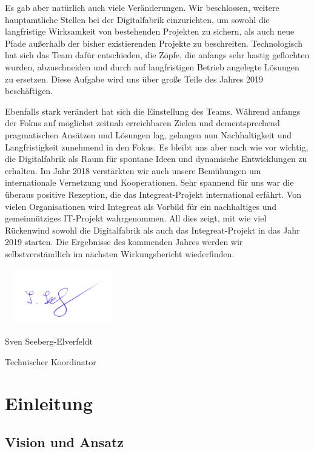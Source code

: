 \documentclass[12pt, a4paper]{article} %
\begin{document}
Es gab aber natürlich auch viele Veränderungen. Wir beschlossen, weitere
hauptamtliche Stellen bei der Digitalfabrik einzurichten, um sowohl die
langfristige Wirksamkeit von bestehenden Projekten zu sichern, als auch
neue Pfade außerhalb der bisher existierenden Projekte zu beschreiten.
Technologisch hat sich das Team dafür entschieden, die Zöpfe, die
anfangs sehr hastig geflochten wurden, abzuschneiden und durch auf
langfristigen Betrieb angelegte Lösungen zu ersetzen. Diese Aufgabe wird
uns über große Teile des Jahres 2019 beschäftigen.

Ebenfalls stark verändert hat sich die Einstellung des Teams. Während
anfangs der Fokus auf möglichst zeitnah erreichbaren Zielen und
dementsprechend pragmatischen Ansätzen und Lösungen lag, gelangen nun
Nachhaltigkeit und Langfristigkeit zunehmend in den Fokus. Es bleibt uns
aber nach wie vor wichtig, die Digitalfabrik als Raum für spontane Ideen
und dynamische Entwicklungen zu erhalten. Im Jahr 2018 verstärkten wir
auch unsere Bemühungen um internationale Vernetzung und Kooperationen.
Sehr spannend für uns war die überaus positive Rezeption, die das
Integreat-Projekt international erfährt. Von vielen Organisationen wird
Integreat als Vorbild für ein nachhaltiges und gemeinnütziges IT-Projekt
wahrgenommen. All dies zeigt, mit wie viel Rückenwind sowohl die
Digitalfabrik als auch das Integreat-Projekt in das Jahr 2019 starten.
Die Ergebnisse des kommenden Jahres werden wir selbstverständlich im
nächsten Wirkungsbericht wiederfinden.

\includegraphics[width=2.0197in,height=0.95764in]{./media/image1.png}

Sven Seeberg-Elverfeldt

Technischer Koordinator

\hypertarget{einleitung}{%
\section{Einleitung}\label{einleitung}}

\hypertarget{vision-und-ansatz}{%
\subsection{Vision und Ansatz}\label{vision-und-ansatz}}
\end{document}
